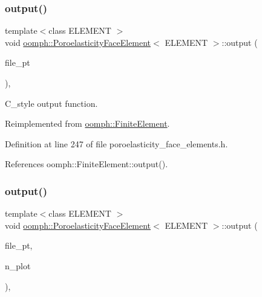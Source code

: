 \subsubsection{\texorpdfstring{output()}{output()}\hspace{0.1cm}{\footnotesize\ttfamily [3/4]}}
{\footnotesize\ttfamily template$<$class E\+L\+E\+M\+E\+NT $>$ \\
void \hyperlink{classoomph_1_1PoroelasticityFaceElement}{oomph\+::\+Poroelasticity\+Face\+Element}$<$ E\+L\+E\+M\+E\+NT $>$\+::output (\begin{DoxyParamCaption}\item[{F\+I\+LE $\ast$}]{file\+\_\+pt }\end{DoxyParamCaption})\hspace{0.3cm}{\ttfamily [inline]}, {\ttfamily [virtual]}}



C\+\_\+style output function. 



Reimplemented from \hyperlink{classoomph_1_1FiniteElement_a72cddd09f8ddbee1a20a1ff404c6943e}{oomph\+::\+Finite\+Element}.



Definition at line 247 of file poroelasticity\+\_\+face\+\_\+elements.\+h.



References oomph\+::\+Finite\+Element\+::output().

\mbox{\label{classoomph_1_1PoroelasticityFaceElement_a27547d8d4f375ad212f6108bf1d818f8}} 
\subsubsection{\texorpdfstring{output()}{output()}\hspace{0.1cm}{\footnotesize\ttfamily [4/4]}}
{\footnotesize\ttfamily template$<$class E\+L\+E\+M\+E\+NT $>$ \\
void \hyperlink{classoomph_1_1PoroelasticityFaceElement}{oomph\+::\+Poroelasticity\+Face\+Element}$<$ E\+L\+E\+M\+E\+NT $>$\+::output (\begin{DoxyParamCaption}\item[{F\+I\+LE $\ast$}]{file\+\_\+pt,  }\item[{const unsigned \&}]{n\+\_\+plot }\end{DoxyParamCaption})\hspace{0.3cm}{\ttfamily [inline]}, {\ttfamily [virtual]}}



